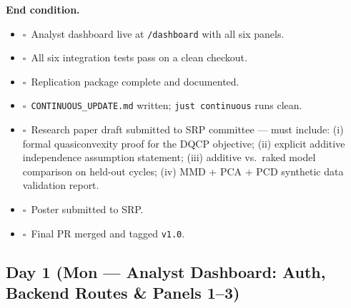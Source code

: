\documentclass[11pt]{article}
\newcommand{\dayhead}[2]{%
  \subsection*{Day #1 \normalfont\small\color{codegray}(#2)}}
\newcommand{\done}{\textcolor{sectionblue}{$\square$}\ }
\begin{document}
\textbf{End condition.}
\begin{itemize}[leftmargin=1.6em, itemsep=1pt]
  \item \done Analyst dashboard live at \texttt{/dashboard} with all six panels.
  \item \done All six integration tests pass on a clean checkout.
  \item \done Replication package complete and documented.
  \item \done \texttt{CONTINUOUS\_UPDATE.md} written; \texttt{just continuous} runs clean.
  \item \done Research paper draft submitted to SRP committee --- must include:
        (i) formal quasiconvexity proof for the DQCP objective;
        (ii) explicit additive independence assumption statement;
        (iii) additive vs.\ raked model comparison on held-out cycles;
        (iv) MMD + PCA + PCD synthetic data validation report.
  \item \done Poster submitted to SRP.
  \item \done Final PR merged and tagged \texttt{v1.0}.
\end{itemize}

\dayhead{1}{Mon --- Analyst Dashboard: Auth, Backend Routes \& Panels 1--3}
\end{document}
